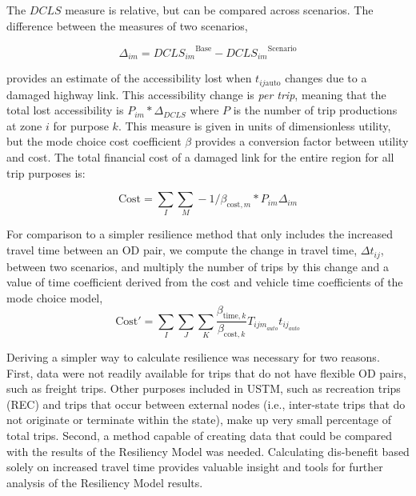 The \(DCLS\) measure is relative, but can be compared across
scenarios. The difference between the measures of two scenarios,

\begin{equation}
\Delta_{im} = {DCLS_{im}}^{\mathrm{Base}} - {DCLS_{im}}^{\mathrm{Scenario}}
  \label{eq:deltas}
\end{equation}

 \noindent provides an estimate of the accessibility lost when
 \(t_{ij\mathrm{auto}}\)
changes due to a damaged highway link. This accessibility change is \emph{per
trip},
meaning that the total lost accessibility is \(P_{im} * \Delta_{DCLS}\) where
\(P\) is
the number of trip productions at zone \(i\) for purpose \(k\). This measure is
given in units of dimensionless utility, but the mode choice cost coefficient
\(\beta\) provides a conversion factor between utility and cost. The total
financial
cost of a damaged link for the entire region for all trip purposes is:

\begin{equation}
\mathrm{Cost} = \sum_{I}\sum_{M} -1 / \beta_{\mathrm{cost},m} * P_{im}
\Delta_{im}
  \label{eq:totalcost}
\end{equation}

For comparison to a simpler resilience method that only includes the increased
travel time between an OD pair, we compute the change in travel
time, \(\Delta t_{ij}\), between two scenarios, and multiply the number of trips by this change
and a value of time coefficient derived from the cost and vehicle time
coefficients of the mode choice model,
\begin{equation}
\mathrm{Cost}' =  \sum_I \sum_J \sum_K \frac{\beta_{\mathrm{time}, k}
}{\beta_{\mathrm{cost}, k}} T_{{ijm}_{auto}} t_{{ij}_{auto}}
  \label{eq:ttmethod}
\end{equation}

\noindent Deriving a simpler way to calculate resilience was necessary for two
reasons. First, data were not readily available for trips that do not have
flexible OD pairs, such as freight trips. Other purposes included in USTM,
such as recreation trips (REC) and trips that occur between external nodes
(i.e., inter-state trips that do not originate or terminate within the state),
make up very small percentage of total trips. Second, a method capable of
creating data that could be compared with the results of the Resiliency Model
was needed. Calculating dis-benefit
based solely on increased travel time provides valuable insight and tools for
further analysis of the Resiliency Model results.

